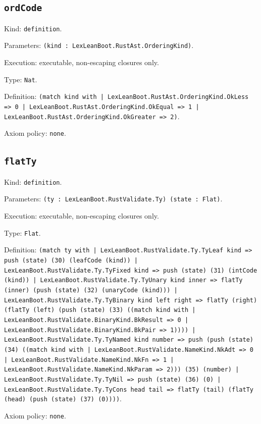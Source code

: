 \documentclass[11pt]{article}
\begin{document}
\subsection*{\texttt{ordCode}}
\noindent Kind: \texttt{definition}.\par
\noindent Parameters: \texttt{(kind : LexLeanBoot.RustAst.OrderingKind)}.\par
\noindent Execution: executable, non-escaping closures only.\par
\noindent Type: \texttt{Nat}.\par
\noindent Definition: \texttt{(match kind with | LexLeanBoot.RustAst.OrderingKind.OkLess => 0 | LexLeanBoot.RustAst.OrderingKind.OkEqual => 1 | LexLeanBoot.RustAst.OrderingKind.OkGreater => 2)}.\par
\noindent Axiom policy: \texttt{none}.\par
\subsection*{\texttt{flatTy}}
\noindent Kind: \texttt{definition}.\par
\noindent Parameters: \texttt{(ty : LexLeanBoot.RustValidate.Ty) (state : Flat)}.\par
\noindent Execution: executable, non-escaping closures only.\par
\noindent Type: \texttt{Flat}.\par
\noindent Definition: \texttt{(match ty with | LexLeanBoot.RustValidate.Ty.TyLeaf kind => push (state) (30) (leafCode (kind)) | LexLeanBoot.RustValidate.Ty.TyFixed kind => push (state) (31) (intCode (kind)) | LexLeanBoot.RustValidate.Ty.TyUnary kind inner => flatTy (inner) (push (state) (32) (unaryCode (kind))) | LexLeanBoot.RustValidate.Ty.TyBinary kind left right => flatTy (right) (flatTy (left) (push (state) (33) ((match kind with | LexLeanBoot.RustValidate.BinaryKind.BkResult => 0 | LexLeanBoot.RustValidate.BinaryKind.BkPair => 1)))) | LexLeanBoot.RustValidate.Ty.TyNamed kind number => push (push (state) (34) ((match kind with | LexLeanBoot.RustValidate.NameKind.NkAdt => 0 | LexLeanBoot.RustValidate.NameKind.NkFn => 1 | LexLeanBoot.RustValidate.NameKind.NkParam => 2))) (35) (number) | LexLeanBoot.RustValidate.Ty.TyNil => push (state) (36) (0) | LexLeanBoot.RustValidate.Ty.TyCons head tail => flatTy (tail) (flatTy (head) (push (state) (37) (0))))}.\par
\noindent Axiom policy: \texttt{none}.\par
\end{document}
